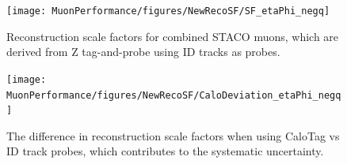 \begin{figure}[phtb]
  \begin{center}
  \texttt{[image: MuonPerformance/figures/NewRecoSF/SF\_etaPhi\_negq]}
 \caption{ Reconstruction scale factors for combined STACO muons, which are derived from Z tag-and-probe using ID tracks as probes.}
 \label{fig:perf:recosf_sf}
 \end{center}
\end{figure}

\begin{figure}[phtb]
  \begin{center}
 \texttt{[image: MuonPerformance/figures/NewRecoSF/CaloDeviation\_etaPhi\_negq]}
 \caption{ The difference in reconstruction scale factors when using CaloTag vs ID track probes, which contributes to the systematic uncertainty. }
 \label{fig:perf:recosf_caloid}
 \end{center}
\end{figure}



